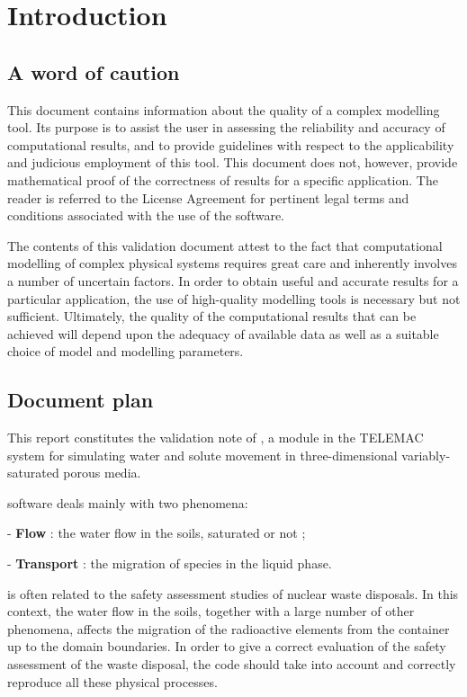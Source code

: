 \section{Introduction}
\subsection{A word of caution}
This document contains information about the quality of a complex modelling tool. Its purpose is to assist the user in assessing the reliability and accuracy of computational results, and to provide guidelines with respect to the applicability and judicious employment of this tool. This document does not, however, provide mathematical proof of the correctness of results for a specific application. The reader is referred to the License Agreement for pertinent legal terms and conditions associated with the use of the software.

The contents of this validation document attest to the fact that computational modelling of complex physical systems requires great care and inherently involves a number of uncertain factors. In order to obtain useful and accurate results for a particular application, the use of high-quality modelling tools is necessary but not sufficient. Ultimately, the quality of the computational results that can be achieved will depend upon the adequacy of available data as well as a suitable choice of model and modelling parameters.
% 
\subsection{Document plan}
This report constitutes the \rel validation note of \tomawac, a module in the TELEMAC system
for simulating water and solute movement in three-dimensional variably-saturated porous media.

\estel software deals mainly with two phenomena:
\begin{list}{-}{}
  \item [-] \textbf{Flow} : the water flow in the soils, saturated or not ;
  \item [-] \textbf{Transport} : the migration of species in the liquid phase.
\end{list}

\estel is often related to the safety assessment studies of nuclear waste disposals.
In this context, the water flow in the soils, together with a large number of other phenomena, affects the migration of the radioactive elements from the container up to the domain boundaries.
In order to give a correct evaluation of the safety assessment of the waste disposal, the code should take into account and correctly reproduce all these physical processes.

